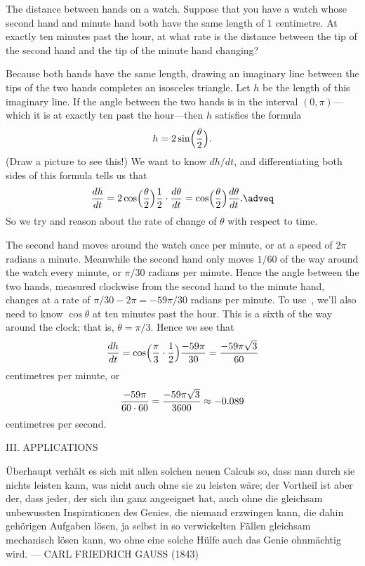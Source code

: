 \medskip\boldlabel The distance between hands on a watch. Suppose that you have a watch whose second hand
and minute hand both have the same length of $1$ centimetre. At exactly ten minutes past the hour, at what
rate is the distance between the tip of the second hand and the tip of the minute hand changing?

Because both hands have the same length, drawing an imaginary line between the tips of the two hands
completes an isosceles triangle. Let $h$ be the length of this imaginary line. If the angle between the
two hands is in the interval $(0,\pi)$---which it is at exactly ten past the hour---then $h$ satisfies
the formula
$$ h = 2\sin\Bigl({\theta\over 2}\Bigr).$$
(Draw a picture to see this!)
We want to know $dh/dt$, and differentiating both sides of this formula tells us that
\edef\eqwatchrate{\the\eqcount}
$${dh\over dt} = 2\cos\Bigl({\theta\over 2}\Bigr) {1\over 2}\cdot {d\theta\over dt}
= \cos\Bigl({\theta\over 2}\Bigr){d\theta\over dt}.\adveq$$
So we try and reason about the rate of change of $\theta$ with respect to time.

The second hand moves around the watch once per minute, or at a speed of $2\pi$ radians a minute.
Meanwhile the second hand only moves $1/60$ of the way around the watch every minute, or $\pi/30$ radians
per minute. Hence the angle between the two hands, measured clockwise from the second hand to the minute hand,
changes at a rate of $\pi/30-2\pi = -59\pi/30$ radians per minute.
To use~\refeq{\eqwatchrate}, we'll also need to know $\cos\theta$ at ten minutes past the hour. This
is a sixth of the way around the clock; that is, $\theta= \pi/3$.
Hence we see that
$${dh\over dt} = \cos\Bigl({\pi\over 3}\cdot {1\over 2}\Bigr) {-59\pi\over 30} = {-59\pi\sqrt 3\over 60}$$
centimetres per minute, or
$$ {-59\pi \over 60\cdot 60} = {-59\pi\sqrt 3\over 3600} \approx -0.089$$
centimetres per second.

\vfill\eject
\begingroup\headline{\hfil}\footline{\hfil}
\centerline{\titlefont III. APPLICATIONS}
\vskip160pt
\bigskip
\begingroup\obeylines\eightssi
\hfill \"Uberhaupt verh\"alt es sich
\hfill mit allen solchen neuen Calculs so,
\hfill dass man durch sie nichts leisten kann,
\hfill was nicht auch ohne sie zu leisten w\"are;
\hfill der Vortheil ist aber der, dass {\eightss[...]}
\hfill jeder, der sich ihn ganz angeeignet hat,
\hfill auch ohne die gleichsam unbewussten
\hfill Inspirationen des Genies,
\hfill die niemand erzwingen kann,
\hfill die dahin geh\"origen Aufgaben l\"osen,
\hfill ja selbst in so verwickelten F\"allen
\hfill gleichsam mechanisch l\"osen kann,
\hfill wo ohne eine solche H\"ulfe
\hfill auch das Genie ohnm\"achtig wird.
\eightss
\smallskip
\hfill --- CARL FRIEDRICH GAUSS (1843)
\endgroup%
\bigskip\goodbreak
\vfill\eject
\endgroup%

